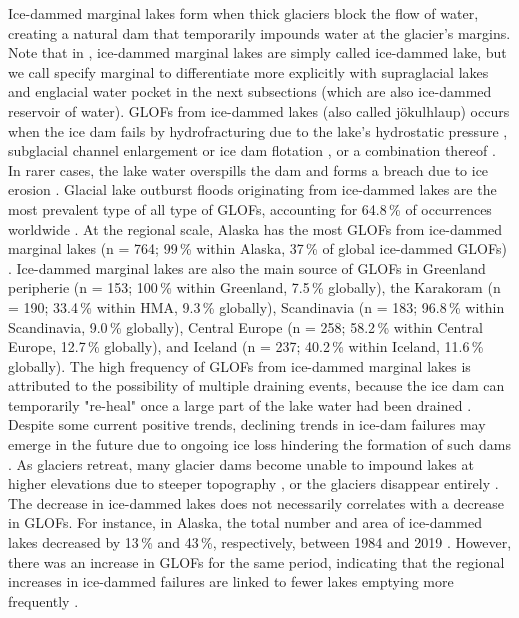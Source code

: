 
Ice-dammed marginal lakes form when thick glaciers block the flow of water, creating a natural dam that temporarily impounds water at the glacier's margins. Note that in \cite{Lutzow&al2023,Zhang&al2024}, ice-dammed marginal lakes are simply called ice-dammed lake, but we call specify marginal to differentiate more explicitly with supraglacial lakes and englacial water pocket in the next subsections (which are also ice-dammed reservoir of water). GLOFs from ice-dammed lakes (also called jökulhlaup) occurs when the ice dam fails by hydrofracturing due to the lake's hydrostatic pressure \citep[e.g.][]{Lindner&al2020}, subglacial channel enlargement \citep{Nye1976} or ice dam flotation \citep[e.g.][]{Bjornsson&al1996}, or a combination thereof \citep{Flowers&al2004}. In rarer cases, the lake water overspills the dam and forms a breach due to ice erosion \citep[e.g.][]{Walder&Costa1996,Raymond&Nolan2000,Mayer&Schuler2005}. Glacial lake outburst floods originating from ice-dammed lakes are the most prevalent type of all type of GLOFs, accounting for 64.8\,\% of occurrences worldwide \cite{Lutzow&al2023}. At the regional scale, Alaska has the most GLOFs from ice-dammed marginal lakes (n = 764; 99\,\% within Alaska, 37\,\% of global ice-dammed GLOFs) \citep{Emmer&al2022}. Ice-dammed marginal lakes are also the main source of GLOFs in Greenland peripherie (n = 153; 100\,\% within Greenland, 7.5\,\% globally), the Karakoram (n = 190; 33.4\,\% within HMA, 9.3\,\% globally), Scandinavia (n = 183; 96.8\,\% within Scandinavia, 9.0\,\% globally), Central Europe (n = 258; 58.2\,\% within Central Europe, 12.7\,\% globally), and Iceland (n = 237; 40.2\,\% within Iceland, 11.6\,\% globally)\citep{Zhang&al2024}. The high frequency of GLOFs from ice-dammed marginal lakes is attributed to the possibility of multiple draining events, because the ice dam can temporarily "re-heal" once a large part of the lake water had been drained \citep{Zhang&al2024}. Despite some current positive trends, declining trends in ice-dam failures may emerge in the future due to ongoing ice loss hindering the formation of such dams \citep{Rick&al2022}. As glaciers retreat, many glacier dams become unable to impound lakes at higher elevations due to steeper topography \cite{Zhang&al2024}, or the glaciers disappear entirely \citep[e.g.][]{Geertsema&Clague2005,Tweed&Russel1999,Wolf}. The decrease in ice-dammed lakes does not necessarily correlates with a decrease in GLOFs. For instance, in Alaska, the total number and area of ice-dammed lakes decreased by 13\,\% and 43\,\%, respectively, between 1984 and 2019 \citep{Veh&al2022}. However, there was an increase in GLOFs for the same period, indicating that the regional increases in ice-dammed failures are linked to fewer lakes emptying more frequently \citep{Veh&al2022}.


